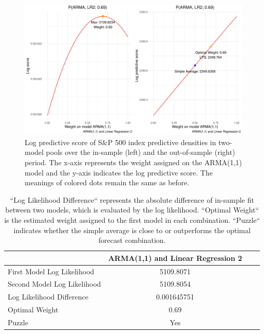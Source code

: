 \documentclass{monashthesis}
\begin{document}
\begin{figure}[ht]
\centering
\includegraphics[scale=0.6]{figures/SP500_stationary.pdf}
\caption{Log predictive score of S\&P 500 index predictive densities in two-model pools over the in-sample (left) and the out-of-sample (right) period. The x-axis represents the weight assigned on the ARMA(1,1) model and the y-axis indicates the log predictive score. The meanings of colored dots remain the same as before.}
\label{fig:stat}
\end{figure}

\begin{table}[ht]
  \centering
    \begin{tabular}{l|ccc}
    \toprule
                                      &   ARMA(1,1) and Linear Regression 2   \\  
    \midrule
    First Model Log Likelihood        &               5109.8071               \\
    Second Model Log Likelihood       &               5109.8054               \\
    Log Likelihood Difference         &              0.001645751              \\
    Optimal Weight                    &                0.69                   \\
    Puzzle                            &                 Yes                   \\
    \bottomrule
    \end{tabular}
  \caption{``Log Likelihood Difference`` represents the absolute difference of in-sample fit between two models, which is evaluated by the log likelihood. ``Optimal Weight`` is the estimated weight assigned to the first model in each combination. ``Puzzle`` indicates whether the simple average is close to or outperforms the optimal forecast combination.}
  \label{tab:statfit}
\end{table}
\end{document}
